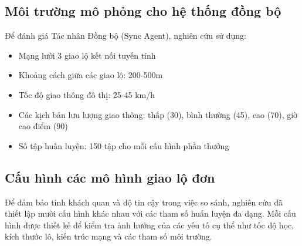 \subsection{Môi trường mô phỏng cho hệ thống đồng bộ}
Để đánh giá Tác nhân Đồng bộ (Sync Agent), nghiên cứu sử dụng:
\begin{itemize}
    \item Mạng lưới 3 giao lộ kết nối tuyến tính

    \item Khoảng cách giữa các giao lộ: 200-500m

    \item Tốc độ giao thông đô thị: 25-45 km/h

    \item Các kịch bản lưu lượng giao thông: thấp (30), bình thường (45), cao (70), giờ cao
        điểm (90)

    \item Số tập huấn luyện: 150 tập cho mỗi cấu hình phần thưởng
\end{itemize}

\subsection{Cấu hình các mô hình giao lộ đơn}

Để đảm bảo tính khách quan và độ tin cậy trong việc so sánh, nghiên cứu đã thiết
lập mười cấu hình khác nhau với các tham số huấn luyện đa dạng. Mỗi cấu hình
được thiết kế để kiểm tra ảnh hưởng của các yếu tố cụ thể như tốc độ học, kích thước
lô, kiến trúc mạng và các tham số môi trường.

